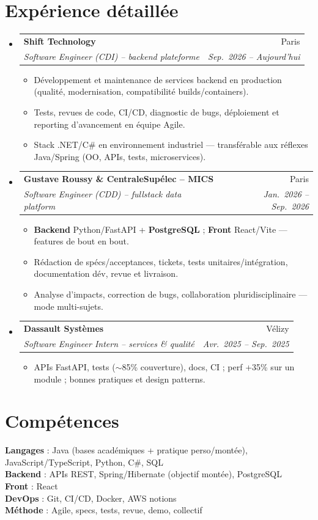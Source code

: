 \documentclass[a4paper,10.5pt]{article}
\makeatletter
\newcommand{\resumeItem}[1]{\item\small{#1}}
\newcommand{\resumeSubheading}[4]{\vspace{4pt}\item\begin{tabular*}{0.97\textwidth}[t]{l@{\extracolsep{\fill}}r}\textbf{#1}&{#2}\\\textit{\small #3}&\textit{\small #4}\\\end{tabular*}\vspace{2pt}}
\newcommand{\resumeSubHeadingListStart}{\begin{itemize}[leftmargin=0.08in,label={}]}
\newcommand{\resumeSubHeadingListEnd}{\end{itemize}}
\makeatother
\begin{document}
\section{Exp\'erience d\'etaill\'ee}
\resumeSubHeadingListStart
  \resumeSubheading
    {Shift Technology}{Paris}
    {Software Engineer (CDI) -- backend plateforme}{Sep.~2026 -- Aujourd'hui}
    \begin{itemize}
      \resumeItem{D\'eveloppement et maintenance de services backend en production (qualit\'e, modernisation, compatibilit\'e builds/containers).}
      \resumeItem{Tests, revues de code, CI/CD, diagnostic de bugs, d\'eploiement et reporting d'avancement en \'equipe Agile.}
      \resumeItem{Stack .NET/C\# en environnement industriel --- transf\'erable aux r\'eflexes Java/Spring (OO, APIs, tests, microservices).}
    \end{itemize}
  \resumeSubheading
    {Gustave Roussy \& CentraleSup\'elec -- MICS}{Paris}
    {Software Engineer (CDD) -- fullstack data platform}{Jan.~2026 -- Sep.~2026}
    \begin{itemize}
      \resumeItem{\textbf{Backend} Python/FastAPI + \textbf{PostgreSQL} ; \textbf{Front} React/Vite --- features de bout en bout.}
      \resumeItem{R\'edaction de sp\'ecs/acceptances, tickets, tests unitaires/int\'egration, documentation d\'ev, revue et livraison.}
      \resumeItem{Analyse d'impacts, correction de bugs, collaboration pluridisciplinaire --- mode multi-sujets.}
    \end{itemize}
  \resumeSubheading
    {Dassault Syst\`emes}{V\'elizy}
    {Software Engineer Intern -- services \& qualit\'e}{Avr.~2025 -- Sep.~2025}
    \begin{itemize}
      \resumeItem{APIs FastAPI, tests ($\sim$85\% couverture), docs, CI ; perf +35\% sur un module ; bonnes pratiques et design patterns.}
    \end{itemize}
\resumeSubHeadingListEnd

\section{Comp\'etences}
\begin{itemize}[leftmargin=0.08in,label={}]\small{\item{
\textbf{Langages} : Java (bases acad\'emiques + pratique perso/mont\'ee), JavaScript/TypeScript, Python, C\#, SQL \\
\textbf{Backend} : APIs REST, Spring/Hibernate (objectif mont\'ee), PostgreSQL \\
\textbf{Front} : React \\
\textbf{DevOps} : Git, CI/CD, Docker, AWS notions \\
\textbf{M\'ethode} : Agile, specs, tests, revue, demo, collectif
}}\end{itemize}
\end{document}
